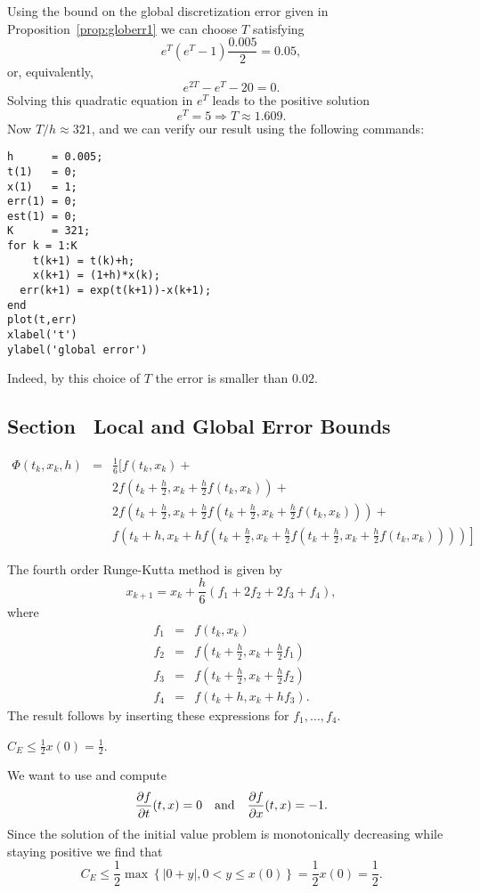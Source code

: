 \soln Using the bound on the global discretization error
given in Proposition~\ref{prop:globerr1} we can choose
$T$ satisfying
\[
e^{T}(e^{T}-1)\frac{0.005}{2} = 0.05,
\]
or, equivalently,
\[
e^{2T} - e^T - 20 = 0.
\]
Solving this quadratic equation in $e^T$ leads to the positive
solution
\[
e^T = 5 \Rightarrow T \approx 1.609.
\]
Now $T/h \approx 321$, and we can verify our result using the
following \Matlab commands:
\begin{verbatim}
h      = 0.005;
t(1)   = 0;
x(1)   = 1;
err(1) = 0;
est(1) = 0;
K      = 321;
for k = 1:K
    t(k+1) = t(k)+h;
    x(k+1) = (1+h)*x(k);
  err(k+1) = exp(t(k+1))-x(k+1);
end
plot(t,err)
xlabel('t')
ylabel('global error')
\end{verbatim}
Indeed, by this choice of $T$ the error is smaller than $0.02$.



\subsection*{Section~\protect{\ref{sec:LGEE}} Local and Global Error Bounds}

 \ans
\begin{eqnarray*}
\Phi(t_k,x_k,h) & = & \frac{1}{6}\Big[f(t_k,x_k)+\\
&&2f\left(t_k+\frac{h}{2},x_k+\frac{h}{2}f(t_k,x_k)\right) +\\
&&2f\left(t_k+\frac{h}{2},x_k+
  \frac{h}{2}f\left(t_k+\frac{h}{2},x_k+\frac{h}{2}f(t_k,x_k)\right)\right)+\\
&&\left.f\left(t_k+h,x_k+hf\left(t_k+\frac{h}{2},x_k+
  \frac{h}{2}f\left(t_k+\frac{h}{2},x_k+
  \frac{h}{2}f(t_k,x_k)\right)\right)\right)\right]
\end{eqnarray*}

\soln The fourth order Runge-Kutta method is given by
\[
x_{k+1} = x_k+\frac{h}{6}(f_1+2f_2+2f_3+f_4),
\]
where
\begin{eqnarray*}
f_1 &=& f(t_k,x_k)\\
f_2 &=& f\left(t_k+\frac{h}{2},x_k+\frac{h}{2}f_1\right)\\
f_3 &=& f\left(t_k+\frac{h}{2},x_k+\frac{h}{2}f_2\right)\\
f_4 &=& f(t_k+h,x_k+hf_3).
\end{eqnarray*}
The result follows by inserting these expressions for $f_1,\ldots,f_4$.

\newpage
{} \ans $C_E \le \frac{1}{2}x(0)=\frac{1}{2}$.

\soln We want to use  and compute
\[
\frac{\partial f}{\partial t}(t,x)=0\quad\mbox{and}\quad
\frac{\partial f}{\partial x}(t,x)=-1.
\]
Since the solution of the initial value problem is monotonically
decreasing while staying positive we find that
\[
C_E\le \frac{1}{2}\max\left\{ \left\vert 0+y\right\vert,
0<y\le x(0) \right\} = \frac{1}{2}x(0)=\frac{1}{2}.
\]
